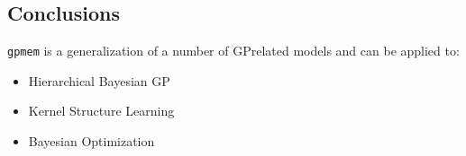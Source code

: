 \documentclass[a0,portrait]{a0poster}
\begin{document}
\begin{multicols}{2}
\section*{Conclusions}
{\tt gpmem} is a generalization of a number of GP\newline related models and can be applied to:
\begin{itemize}
\setlength{\itemindent}{1cm}
\item Hierarchical Bayesian GP
\item Kernel Structure Learning
\item Bayesian Optimization
\end{itemize}

\color{DarkSlateGray} %











\end{multicols}
\end{document}
